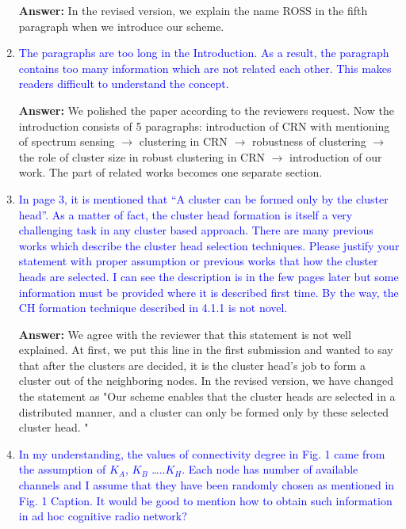 \documentclass[10pt,a4paper]{article}
\begin{document}
\begin{enumerate}
    \textbf{Answer:} In the revised version, we explain the name ROSS in the fifth paragraph when we introduce our scheme.
    
\item \textcolor{blue}{  The paragraphs are too long in the Introduction. As a result, the paragraph contains too many information which are not related each other. This makes readers difficult to understand the concept.}
    
    \textbf{Answer:} We polished the paper according to the reviewers request. 
    Now the introduction consists of 5 paragraphs: introduction of CRN with mentioning of spectrum sensing $\rightarrow$ clustering in CRN $\rightarrow$ robustness of clustering $\rightarrow$ the role of cluster size in robust clustering in CRN $\rightarrow$ introduction of our work.
    The part of related works becomes one separate section.
    
\item \textcolor{blue}{   In page 3, it is mentioned that “A cluster can be formed only by the cluster head”. As a matter of fact, the cluster head formation is itself a very challenging task in any cluster based approach. There are many previous works which describe the cluster head selection techniques. Please justify your statement with proper assumption or previous works that how the cluster heads are selected. I can see the description is in the few pages later but some information must be provided where it is described first time. By the way, the CH formation technique described in 4.1.1 is not novel.}

\textbf{Answer:} We agree with the reviewer that this statement is not well explained.
	    At first, we put this line in the first submission and wanted to say that after the clusters are decided, it is the cluster head's job to form a cluster out of the neighboring nodes.
In the revised version, we have changed the statement as "Our scheme enables that the cluster heads are selected in a distributed manner, and a cluster can only be formed only by these selected cluster head. "
    
\item \textcolor{blue}{  In my understanding, the values of connectivity degree in Fig. 1 came from the assumption of $K_A$, $K_B$ …..$K_H$. Each node has number of available channels and I assume that they have been randomly chosen as mentioned in Fig. 1 Caption. It would be good to mention how to obtain such information in ad hoc cognitive radio network?}


\end{enumerate}
\end{document}
